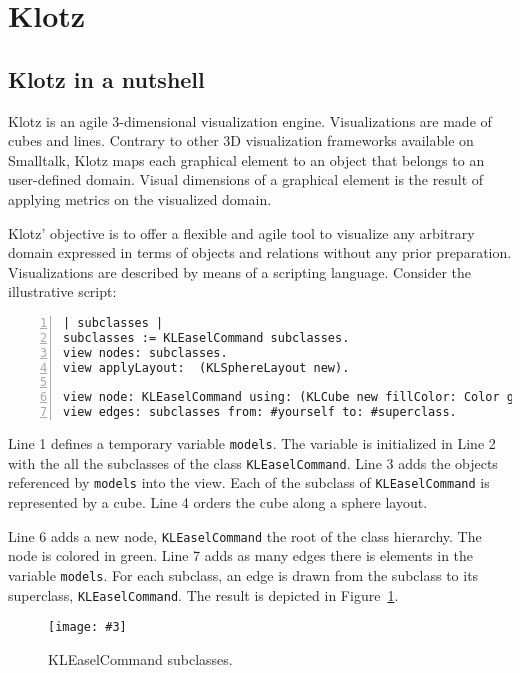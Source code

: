 \documentclass{sig-alternate}
\newcommand{\ct}{\lstinline[backgroundcolor=\color{white},basicstyle=\footnotesize\ttfamily]}
\newcommand{\fig}[4]{
	\begin{figure}[#1]
		\centering
		\texttt{[image: \#3]}
		\caption{\label{fig:#3}#4}
	\end{figure}}
\newcommand{\seclabel}[1]{\label{sec:#1}}
\newcommand{\figref}[1]{Figure~\ref{fig:#1}}
\begin{document}

\section{Klotz} \seclabel{klotz}

\subsection{Klotz in a nutshell} \seclabel{nutshell}
Klotz is an agile 3-dimensional visualization engine. Visualizations are made of cubes and lines. Contrary to other 3D visualization frameworks available on Smalltalk, Klotz maps each graphical element to an object that belongs to an user-defined domain. Visual dimensions of a graphical element is the result of applying metrics on the visualized domain. 

Klotz' objective is to offer a flexible and agile tool to visualize any arbitrary domain expressed in terms of objects and relations without any prior preparation. Visualizations are described by means of a scripting language. Consider the illustrative script:

\begin{lstlisting}[numbers=left]
| subclasses |
subclasses := KLEaselCommand subclasses.
view nodes: subclasses.
view applyLayout:  (KLSphereLayout new).

view node: KLEaselCommand using: (KLCube new fillColor: Color green).
view edges: subclasses from: #yourself to: #superclass.   
\end{lstlisting}

Line 1 defines a temporary variable \ct{models}. 
The variable is initialized in Line 2 with the all the subclasses of the class \ct{KLEaselCommand}.
Line 3 adds the objects referenced by \ct{models} into the view. Each of the subclass of \ct{KLEaselCommand} is represented by a cube.
Line 4 orders the cube along a sphere layout.

Line 6 adds a new node, \ct{KLEaselCommand} the root of the class hierarchy. The node is colored in green.
Line 7 adds as many edges there is elements in the variable \ct{models}. For each subclass, an edge is drawn from the subclass to its superclass, \ct{KLEaselCommand}. The result is depicted in \figref{figure1.png}.

\fig{h}{0.4}{figure1.png}{KLEaselCommand subclasses.}
\end{document}
